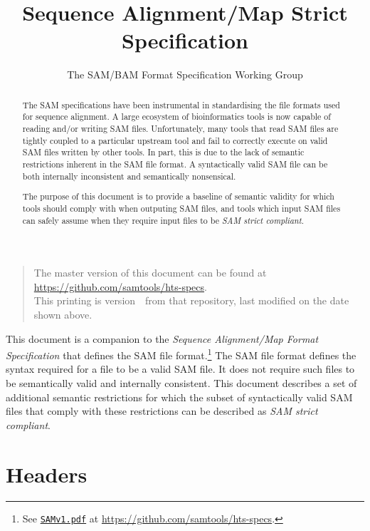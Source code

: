 \documentclass[10pt]{article}
\begin{document}

\title{Sequence Alignment/Map Strict Specification}
\author{The SAM/BAM Format Specification Working Group}
\date{\headdate}
\maketitle
\begin{quote}\small
The master version of this document can be found at
\url{https://github.com/samtools/hts-specs}.\\
This printing is version~\commitdesc\ from that repository,
last modified on the date shown above.
\end{quote}
\vspace*{1em}

\noindent
This document is a companion to the {\sl Sequence Alignment/Map Format
Specification} that defines the SAM file format.\footnote{See
\href{http://samtools.github.io/hts-specs/SAMv1.pdf}{\tt SAMv1.pdf} at \url{https://github.com/samtools/hts-specs}.}
The SAM file format defines the syntax required for a file to be
a valid SAM file. It does not require such files to be semantically
valid and internally consistent.
This document describes a set of additional semantic restrictions
for which the subset of syntactically valid SAM files that comply
with these restrictions can be described as \textit{SAM strict
compliant}.

\renewcommand{\abstractname}{Introduction}
\begin{abstract}

The SAM specifications have been instrumental in standardising
the file formats used for sequence alignment. A large ecosystem of
bioinformatics tools is now capable of reading and/or writing
SAM files. Unfortunately, many tools that read SAM files are tightly
coupled to a particular upstream tool 
and fail to correctly execute on valid SAM files written by other
tools. In part, this is due to the lack of semantic restrictions
inherent in the SAM file format. A syntactically valid SAM file
can be both internally inconsistent and semantically nonsensical.

The purpose of this document is to provide a baseline of semantic
validity for which tools should comply with when outputing SAM
files, and tools which input SAM files can safely assume when
they require input files to be \textit{SAM strict compliant}.

\end{abstract}

\section{Headers}
\end{document}
